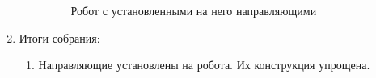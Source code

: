 \begin{enumerate}
\begin{enumerate}
\begin{figure}[H]
\begin{minipage}[h]{0.47\linewidth}
      	\end{minipage}
      	\caption{Робот с установленными на него направляющими}
      \end{figure}
      
    \end{enumerate}
    
	\item Итоги собрания: \newline
	\begin{enumerate}
	  \item  Направляющие установлены на робота. Их конструкция упрощена.\newline
	  

\end{enumerate}
\end{enumerate}
